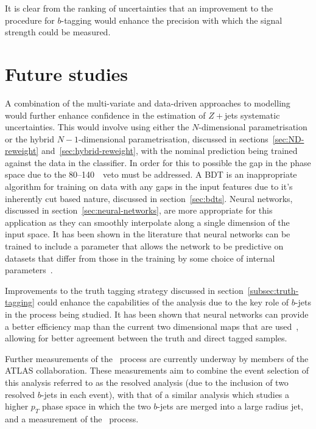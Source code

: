 It is clear from the ranking of uncertainties that an improvement to the
procedure for $b$-tagging would enhance the precision with which the signal
strength could be measured.

\section{Future studies}%
\label{sec:future}

A combination of the multi-variate and data-driven approaches to modelling would
further enhance confidence in the estimation of $Z+$jets systematic
uncertainties. This would involve using either the $N$-dimensional
parametrisation or the hybrid $N-1$-dimensional parametrisation, discussed in
sections~\ref{sec:ND-reweight} and~\ref{sec:hybrid-reweight}, with the nominal
prediction being trained against the data in the classifier. In order for this
to possible the gap in the phase space due to the 80--140~\GeV\ veto must be
addressed. A BDT is an inappropriate algorithm for training on data with any
gaps in the input features due to it's inherently cut based nature, discussed in
section~\ref{sec:bdts}. Neural networks, discussed in
section~\ref{sec:neural-networks}, are more appropriate for this application as
they can smoothly interpolate along a single dimension of the input space. It
has been shown in the literature that neural networks can be trained to include
a parameter that allows the network to be predictive on datasets that differ
from those in the training by some choice of internal
parameters~\cite{param-hep, param-hep-2}.

Improvements to the truth tagging strategy discussed in
section~\ref{subsec:truth-tagging} could enhance the capabilities of the
analysis due to the key role of $b$-jets in the process being studied. It has
been shown that neural networks can provide a better efficiency map than the
current two dimensional maps that are used~\cite{nn-truth-tagging}, allowing for
better agreement between the truth and direct tagged samples.

Further measurements of the \VHbb\ process are currently underway by members of
the ATLAS collaboration. These measurements aim to combine the event selection
of this analysis referred to as the resolved analysis (due to the inclusion of
two resolved $b$-jets in each event), with that of a similar analysis which
studies a higher $p_T$ phase space in which the two $b$-jets are merged into a
large radius jet, and a measurement of the \VHcc\ process.